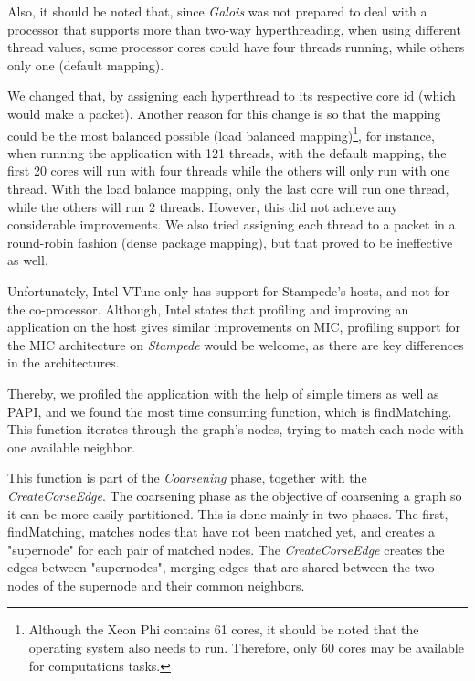 \documentclass[abstract=on,9pt,twocolumn]{scrartcl}
\begin{document}
Also, it should be noted that, since \textit{Galois} was not prepared to deal with a processor that supports more than two-way hyperthreading, when using different thread values, some processor cores could have four threads running, while others only one (default mapping).

We changed that, by assigning each hyperthread to its respective core id (which would make a packet).
Another reason for this change is so that the mapping could be
the most balanced possible (load balanced mapping)\footnote{Although the Xeon Phi contains 61 cores, it should be noted that the
operating system also needs to run. Therefore, only 60 cores may be
available for computations tasks.}, for instance,
when running the application with 121 threads, with the default mapping,
the first 20 cores will run with four threads while the others will only
run with one thread. With the load balance mapping, only the last core
will run one thread, while the others will run 2 threads. However, this did not achieve any considerable improvements. We also tried assigning each thread to a packet in a round-robin fashion (dense package mapping), but that proved to be ineffective as well.




Unfortunately, Intel VTune only has support for Stampede's hosts, and
not for the co-processor. Although, Intel states that profiling and
improving an application on the host gives similar improvements on MIC,
profiling support for the MIC architecture on \textit{Stampede} would be
welcome, as there are key differences in the architectures.

Thereby, we profiled the application with the help of simple timers as
well as PAPI, and we found the most time consuming function, which is
findMatching. This function iterates through the graph's nodes, trying
to match each node with one available neighbor.

This function is part of the \textit{Coarsening} phase, together with
the \textit{CreateCorseEdge}.
The coarsening phase as the objective of coarsening a graph so it can be
more easily partitioned. This is done mainly in two phases. The first,
findMatching, matches nodes that have not been matched yet, and creates
a "supernode" for each pair of matched nodes. The
\textit{CreateCorseEdge} creates the edges between "supernodes", merging
edges that are shared between the two nodes of the supernode and their
common neighbors.
\end{document}
